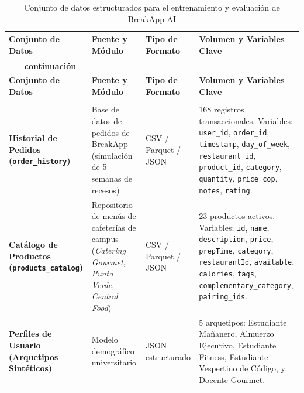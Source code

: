 \documentclass{article}
\begin{document}
\begin{longtable}{|>{\bfseries}p{} |p{} |p{} |p{}|}
    \caption{Conjunto de datos estructurados para el entrenamiento y evaluación de BreakApp-AI}
    \label{tab:datasets-breakapp} \\

    \toprule
    \textbf{Conjunto de Datos}
    & \textbf{Fuente y Módulo}
    & \textbf{Tipo de Formato}
    & \textbf{Volumen y Variables Clave} \\
    \midrule
    \endfirsthead

    \multicolumn{4}{c}%
    {{\tablename\ \thetable{} -- continuación}} \\
    \toprule
    \textbf{Conjunto de Datos}
    & \textbf{Fuente y Módulo}
    & \textbf{Tipo de Formato}
    & \textbf{Volumen y Variables Clave} \\
    \midrule
    \endhead

    \midrule
    \multicolumn{4}{r}{{Continúa en la siguiente página}} \\
    \endfoot

    \bottomrule
    \endlastfoot

    \textbf{Historial de Pedidos (\texttt{order\_history})}
    &
    Base de datos de pedidos de BreakApp (simulación de 5 semanas de recesos)
    &
    CSV / Parquet / JSON
    &
    168 registros transaccionales. Variables: \texttt{user\_id}, \texttt{order\_id}, \texttt{timestamp}, \texttt{day\_of\_week}, \texttt{restaurant\_id}, \texttt{product\_id}, \texttt{category}, \texttt{quantity}, \texttt{price\_cop}, \texttt{notes}, \texttt{rating}.
    \\ \hline

    \textbf{Catálogo de Productos (\texttt{products\_catalog})}
    &
    Repositorio de menús de cafeterías de campus (\textit{Catering Gourmet}, \textit{Punto Verde}, \textit{Central Food})
    &
    CSV / Parquet / JSON
    &
    23 productos activos. Variables: \texttt{id}, \texttt{name}, \texttt{description}, \texttt{price}, \texttt{prepTime}, \texttt{category}, \texttt{restaurantId}, \texttt{available}, \texttt{calories}, \texttt{tags}, \texttt{complementary\_category}, \texttt{pairing\_ids}.
    \\ \hline

    \textbf{Perfiles de Usuario (Arquetipos Sintéticos)}
    &
    Modelo demográfico universitario
    &
    JSON estructurado
    &
    5 arquetipos: Estudiante Mañanero, Almuerzo Ejecutivo, Estudiante Fitness, Estudiante Vespertino de Código, y Docente Gourmet.
    \\ \hline

\end{longtable}
\end{document}
